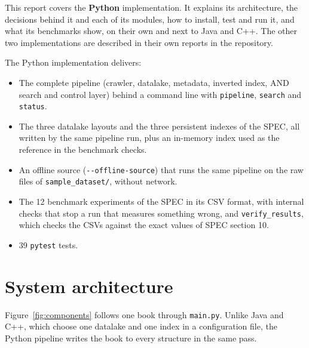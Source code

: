 \documentclass[11pt,a4paper]{article}
\newcommand{\code}[1]{\texttt{#1}}
\begin{document}
This report covers the \textbf{Python} implementation. It explains its architecture, the decisions
behind it and each of its modules, how to install, test and run it, and what its benchmarks show,
on their own and next to Java and C++. The other two implementations are described in their own
reports in the repository.

The Python implementation delivers:
\begin{itemize}
  \item The complete pipeline (crawler, datalake, metadata, inverted index, AND search and control
        layer) behind a command line with \code{pipeline}, \code{search} and \code{status}.
  \item The three datalake layouts and the three persistent indexes of the SPEC, all written by the
        same pipeline run, plus an in-memory index used as the reference in the benchmark checks.
  \item An offline source (\code{-{}-offline-source}) that runs the same pipeline on the raw files
        of \code{sample\_dataset/}, without network.
  \item The 12 benchmark experiments of the SPEC in its CSV format, with internal checks that stop a
        run that measures something wrong, and \code{verify\_results}, which checks the CSVs against
        the exact values of SPEC section 10.
  \item 39 \code{pytest} tests.
\end{itemize}

\section{System architecture}

Figure~\ref{fig:components} follows one book through \code{main.py}. Unlike Java and C++, which
choose one datalake and one index in a configuration file, the Python pipeline writes the book to
every structure in the same pass.
\end{document}

